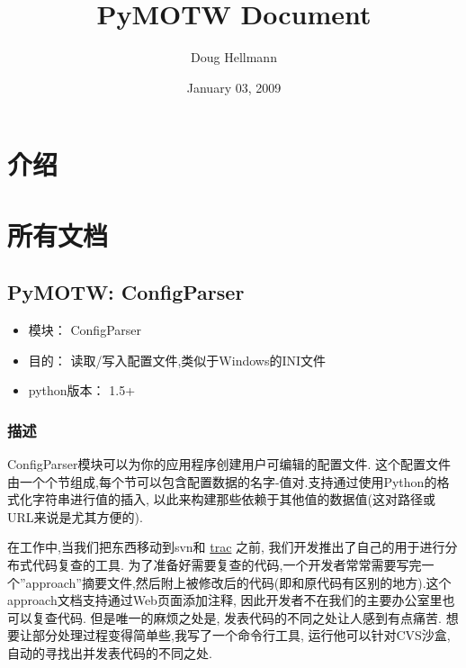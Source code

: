 \documentclass[a4paper,10pt,english]{manual}
\title{PyMOTW Document}
\date{January 03, 2009}
\author{Doug Hellmann}
\begin{document}
\maketitle

\tableofcontents


\resetcurrentobjects


\chapter{介绍}

\resetcurrentobjects


\chapter{所有文档}

\resetcurrentobjects


\section{PyMOTW: ConfigParser}
\begin{itemize}
\item {} 
模块： ConfigParser

\item {} 
目的： 读取/写入配置文件,类似于Windows的INI文件

\item {} 
python版本： 1.5+

\end{itemize}


\subsection{描述}

ConfigParser模块可以为你的应用程序创建用户可编辑的配置文件. 这个配置文件由一个个节组成,每个节可以包含配置数据的名字-值对.支持通过使用Python的格式化字符串进行值的插入, 以此来构建那些依赖于其他值的数据值(这对路径或URL来说是尤其方便的).

在工作中,当我们把东西移动到svn和 \href{http://trac.edgewall.org/}{trac} 之前, 我们开发推出了自己的用于进行分布式代码复查的工具. 为了准备好需要复查的代码,一个开发者常常需要写完一个''approach''摘要文件,然后附上被修改后的代码(即和原代码有区别的地方).这个 approach文档支持通过Web页面添加注释, 因此开发者不在我们的主要办公室里也可以复查代码. 但是唯一的麻烦之处是, 发表代码的不同之处让人感到有点痛苦. 想要让部分处理过程变得简单些,我写了一个命令行工具, 运行他可以针对CVS沙盒,自动的寻找出并发表代码的不同之处.
\end{document}
